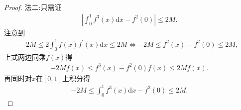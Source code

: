 \documentclass[../../main.tex]{subfiles}%
\begin{document}
\begin{proof}
{\color{blue}法二:}只需证
\begin{align*}
\left| \int_0^1{f^3\left( x \right) \mathrm{d}x}-f^2\left( 0 \right) \right|\leqslant 2M.
\end{align*}
注意到
\begin{align*}
-2M\leqslant 2\int_0^1{f\left( x \right) f^\prime \left( x \right) \mathrm{d}x}\leqslant 2M\Longleftrightarrow -2M\leqslant f^2\left( x \right) -f^2\left( 0 \right) \leqslant 2M,
\end{align*}
上式两边同乘$f\left( x \right)$得
\begin{align*}
-2Mf\left( x \right) \leqslant f^3\left( x \right) -f^2\left( 0 \right) f\left( x \right) \leqslant 2Mf\left( x \right).
\end{align*}
再同时对$x$在$\left[ 0,1 \right]$上积分得
\begin{align*}
-2M\leqslant \int_0^1{f^3\left( x \right) \mathrm{d}x}-f^2\left( 0 \right) \leqslant 2M.
\end{align*}

\end{proof}
\end{document}

